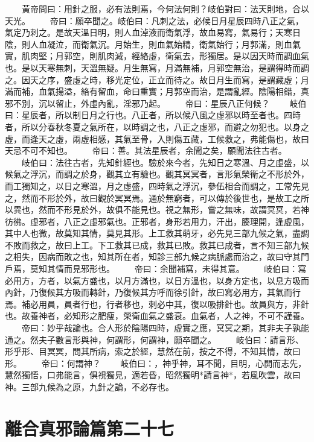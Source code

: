 　　黃帝問曰：用針之服，必有法則焉，今何法何則？岐伯對曰：法天則地，合以天光。
　　帝曰：願卒聞之。岐伯曰：凡刺之法，必候日月星辰四時八正之氣，氣定乃刺之。是故天溫日明，則人血淖液而衛氣浮，故血易寫，氣易行；天寒日陰，則人血凝泣，而衛氣沉。月始生，則血氣始精，衛氣始行；月郭滿，則血氣實，肌肉堅；月郭空，則肌肉減，經絡虛，衛氣去，形獨居。是以因天時而調血氣也。是以天寒無刺，天溫無疑。月生無寫，月滿無補，月郭空無治，是謂得時而調之。因天之序，盛虛之時，移光定位，正立而待之。故日月生而寫，是謂藏虛；月滿而補，血氣揚溢，絡有留血，命曰重實；月郭空而治，是謂亂經。陰陽相錯，真邪不別，沉以留止，外虛內亂，淫邪乃起。
　　帝曰：星辰八正何候？
　　岐伯曰：星辰者，所以制日月之行也。八正者，所以候八風之虛邪以時至者也。四時者，所以分春秋冬夏之氣所在，以時調之也，八正之虛邪，而避之勿犯也。以身之虛，而逢天之虛，兩虛相感，其氣至骨，入則傷五藏，工候救之，弗能傷也，故曰天忌不可不知也。
　　帝曰：善。其法星辰者，余聞之矣，願聞法往古者。
　　岐伯曰：法往古者，先知針經也。驗於來今者，先知日之寒溫、月之虛盛，以候氣之浮沉，而調之於身，觀其立有驗也。觀其冥冥者，言形氣榮衛之不形於外，而工獨知之，以日之寒溫，月之虛盛，四時氣之浮沉，參伍相合而調之，工常先見之，然而不形於外，故曰觀於冥冥焉。通於無窮者，可以傳於後世也，是故工之所以異也，然而不形見於外，故俱不能見也。視之無形，嘗之無味，故謂冥冥，若神彷彿。虛邪者，八正之虛邪氣也。正邪者，身形若用力，汗出，腠理開，逢虛風，其中人也微，故莫知其情，莫見其形。上工救其萌牙，必先見三部九候之氣，盡調不敗而救之，故曰上工。下工救其已成，救其已敗。救其已成者，言不知三部九候之相失，因病而敗之也，知其所在者，知診三部九候之病脈處而治之，故曰守其門戶焉，莫知其情而見邪形也。
　　帝曰：余聞補寫，未得其意。
　　岐伯曰：寫必用方，方者，以氣方盛也，以月方滿也，以日方溫也，以身方定也，以息方吸而內針，乃復候其方吸而轉針，乃復候其方呼而徐引針，故曰寫必用方，其氣而行焉。補必用員，員者行也，行者移也，刺必中其，復以吸排針也。故員與方，非針也。故養神者，必知形之肥瘦，榮衛血氣之盛衰。血氣者，人之神，不可不謹養。
　　帝曰：妙乎哉論也。合人形於陰陽四時，虛實之應，冥冥之期，其非夫子孰能通之。然夫子數言形與神，何謂形，何謂神，願卒聞之。
　　岐伯曰：請言形、形乎形、目冥冥，問其所病，索之於經，慧然在前，按之不得，不知其情，故曰形。
　　帝曰：何謂神？
　　岐伯曰：，神乎神，耳不聞，目明，心開而志先，慧然獨悟，口弗能言，俱視獨見，適若昏，昭然獨明*請言神*，若風吹雲，故曰神。三部九候為之原，九針之論，不必存也。


\section{離合真邪論篇第二十七}

